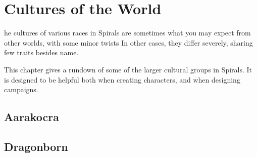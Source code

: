 \chapter{Cultures of the World}
he cultures of various races in Spirals are sometimes what you may expect from other worlds, with some minor twists
In other cases, they differ severely, sharing few traits besides name.

This chapter gives a rundown of some of the larger cultural groups in Spirals.
It is designed to be helpful both when creating characters, and when designing campaigns.


\begin{multicols}{2}
\section{Aarakocra}


\section{Dragonborn}


\end{multicols}